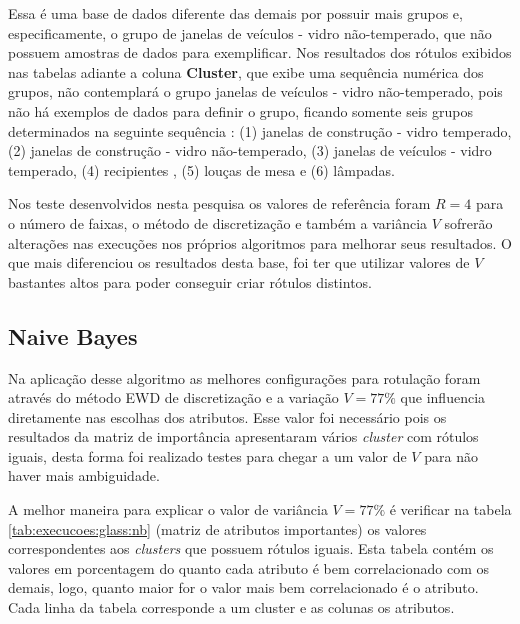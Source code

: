 Essa é uma base de dados diferente das demais por possuir mais grupos e, especificamente, o grupo de janelas de veículos - vidro não-temperado, que não possuem amostras de dados para exemplificar. Nos resultados dos rótulos exibidos nas tabelas adiante a coluna \textbf{Cluster}, que exibe uma sequência numérica dos grupos, não contemplará o grupo janelas de veículos - vidro não-temperado, pois não há exemplos de dados para definir o grupo, ficando somente seis grupos determinados na seguinte sequência : (1) janelas de construção - vidro temperado, (2) janelas de construção - vidro não-temperado, (3) janelas de veículos - vidro temperado, (4) recipientes , (5) louças de mesa e (6) lâmpadas. 

Nos teste desenvolvidos nesta pesquisa os valores de referência foram ${R=4}$ para o número de faixas, o método de discretização  e também a variância ${V}$ sofrerão alterações nas execuções nos próprios algoritmos para melhorar seus resultados. O que mais diferenciou os resultados desta base, foi ter que utilizar valores de ${V}$ bastantes altos para poder conseguir criar rótulos distintos.


\subsection{Naive Bayes} \label{cap:resultados:ssec:glass:nb}

Na aplicação desse algoritmo as melhores configurações para rotulação foram através do método EWD de discretização e a variação ${V=77\%}$ que influencia diretamente nas escolhas dos atributos. Esse valor foi necessário pois os resultados da matriz de importância apresentaram vários \textit{cluster} com rótulos iguais, desta forma foi realizado testes para chegar a um valor de ${V}$ para não haver mais ambiguidade.


A melhor maneira para explicar o valor de variância  ${V=77\%}$ é verificar na tabela \ref{tab:execucoes:glass:nb} (matriz de atributos importantes) os valores correspondentes aos \textit{clusters} que possuem rótulos iguais. Esta tabela contém os valores em porcentagem do quanto cada atributo é bem correlacionado com os demais, logo, quanto maior for o valor mais bem correlacionado é o atributo. Cada linha da tabela corresponde a um cluster e as colunas os atributos.



